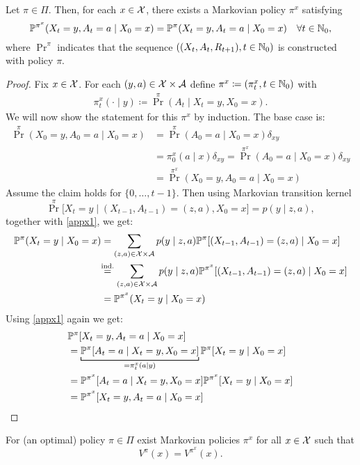 \begin{prop}[Puterman]\label{prop puterman}
	Let \(\pi\in\Pi\). Then, for each \(x\in\mathcal{X}\), there exists a Markovian policy \(\pi^{x}\) satisfying
	\[\mathbb{P}^{\pi^x}(X_t=y,A_t=a\mid X_0=x)=\mathbb{P}^\pi(X_t=y,A_t=a\mid X_0=x)\quad \forall t\in\mathbb{N}_0, \]
	where \(\Pr^\pi\) indicates that the sequence 
	\(((X_t, A_t, R_{t+1}),t\in\mathbb{N}_0 )\) is constructed with policy \(\pi\).
\end{prop}
\begin{proof}
	Fix \(x\in\mathcal{X}\). For each \((y,a)\in\mathcal{X}\times\mathcal{A}\) define \(\pi^x\coloneqq (\pi^x_t,t\in\mathbb{N}_0)\) with
 	\begin{align}
			\pi^x_t(\cdot\mid y)\coloneqq \Pr^\pi (A_t \mid X_t=y,X_0=x).
	\end{align}
	We will now show the statement for this \(\pi^x\) by induction. The base case is:
	\begin{align*}
		\Pr^\pi(X_0=y,A_0=a\mid X_0=x) 
		&= \Pr^\pi(A_0=a\mid X_0=x)\delta_{xy}\\
		&=\pi^x_0(a\mid x)\delta_{xy} 
		= \Pr^{\pi^x}(A_0=a\mid X_0=x)\delta_{xy}\\
		&=\Pr^{\pi^x}(X_0=y, A_0=a\mid X_0=x)
	\end{align*}
	Assume the claim holds for \(\{0,\dots, t-1\}\). Then using Markovian transition kernel
	\[
		\Pr^\pi\big[X_t=y\mid (X_{t-1},A_{t-1})=(z,a), X_0=x\big]=p(y\mid z,a),
	\]
	together with \ref{appx1}, we get:
	\begin{align*}
		\Pr^\pi(X_t=y\mid X_0=x)
		&=\sum_{(z,a)\in\cX\times\cA}p(y\mid z,a)
		\Pr^\pi[(X_{t-1},A_{t-1})=(z,a)\mid X_0=x]\\
		&\lxeq{\text{ind.}} \sum_{(z,a)\in\cX\times\cA}p(y\mid z,a)
		\Pr^{\pi^x}[(X_{t-1},A_{t-1})=(z,a)\mid X_0=x]\\
		&=\Pr^{\pi^x}(X_t=y\mid X_0=x)
	\end{align*}
	Using \ref{appx1} again we get:
	\begin{align*}
		&\Pr^{\pi}[X_t=y, A_t=a \mid X_0=x]\\
		&=\underbracket[0.7pt]{\Pr^\pi[A_t=a \mid X_t=y, X_0=x]}_{=\pi^x_t(a\mid y)}
		\Pr^\pi[X_t=y\mid X_0=x]\\
		&=\Pr^{\pi^x}[A_t=a \mid X_t=y, X_0=x]\Pr^{\pi^x}[X_t=y\mid X_0=x]\\
		&=\Pr^{\pi^x}[X_t=y, A_t=a \mid X_0=x]\qedhere
	\end{align*}
\end{proof}
\begin{corollary}[Puterman]
	For (an optimal) policy \(\pi\in\Pi\) exist Markovian policies \(\pi^x\) for all \(x\in\mathcal{X}\) such that
	\[
		V^\pi(x)=V^{\pi^x}(x).
	\]
\end{corollary}
